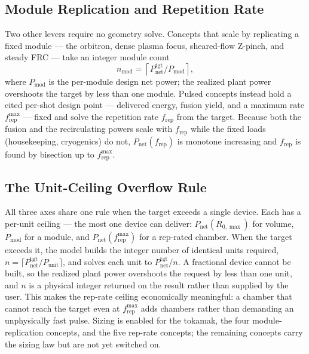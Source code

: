\documentclass{article}
\begin{document}
\subsection{Module Replication and Repetition Rate}
Two other levers require no geometry solve. Concepts that scale by replicating a
fixed module --- the orbitron, dense plasma focus, sheared-flow Z-pinch, and
steady FRC --- take an integer module count
\begin{equation}
n_{\text{mod}} = \left\lceil P_{\text{net}}^{\text{tgt}} / P_{\text{mod}}
  \right\rceil,
\end{equation}
where $P_{\text{mod}}$ is the per-module design net power; the realized plant
power overshoots the target by less than one module. Pulsed concepts instead
hold a cited per-shot design point --- delivered energy, fusion yield, and a
maximum rate $f_{\text{rep}}^{\max}$ --- fixed and solve the repetition rate
$f_{\text{rep}}$ from the target. Because both the fusion and the recirculating
powers scale with $f_{\text{rep}}$ while the fixed loads (housekeeping,
cryogenics) do not, $P_{\text{net}}(f_{\text{rep}})$ is monotone increasing and
$f_{\text{rep}}$ is found by bisection up to $f_{\text{rep}}^{\max}$.

\subsection{The Unit-Ceiling Overflow Rule}
All three axes share one rule when the target exceeds a single device. Each has a
per-unit ceiling --- the most one device can deliver: $P_{\text{net}}(R_{0,\max})$
for volume, $P_{\text{mod}}$ for a module, and $P_{\text{net}}(f_{\text{rep}}^{\max})$
for a rep-rated chamber. When the target exceeds it, the model builds the integer
number of identical units required,
$n = \lceil P_{\text{net}}^{\text{tgt}} / P_{\text{unit}} \rceil$, and solves each
unit to $P_{\text{net}}^{\text{tgt}} / n$. A fractional device cannot be built, so
the realized plant power overshoots the request by less than one unit, and $n$ is a
physical integer returned on the result rather than supplied by the user. This
makes the rep-rate ceiling economically meaningful: a chamber that cannot reach
the target even at $f_{\text{rep}}^{\max}$ adds chambers rather than demanding an
unphysically fast pulse. Sizing is enabled for the tokamak, the four
module-replication concepts, and the five rep-rate concepts; the remaining
concepts carry the sizing law but are not yet switched on.


\end{document}
